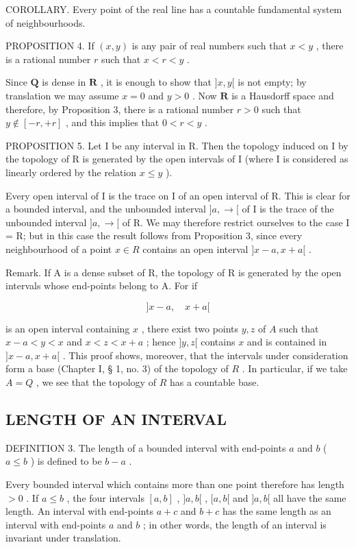 COROLLARY. Every point of the real line has a countable fundamental system of neighbourhoods.

PROPOSITION 4. If \((x, y)\) is any pair of real numbers such that \(x < y\) , there is a rational number \(r\) such that \(x < r < y\) .

Since \(\mathbf{Q}\) is dense in \(\mathbf{R}\) , it is enough to show that \(]x, y[\) is not empty; by translation we may assume \(x = 0\) and \(y > 0\) . Now \(\mathbf{R}\) is a Hausdorff space and therefore, by Proposition 3, there is a rational number \(r > 0\) such that \(y \notin [-r, +r]\) , and this implies that \(0 < r < y\) .

PROPOSITION 5. Let I be any interval in R. Then the topology induced on I by the topology of R is generated by the open intervals of I (where I is considered as linearly ordered by the relation \(x \leqslant y\) ).

Every open interval of I is the trace on I of an open interval of R. This is clear for a bounded interval, and the unbounded interval \(]a, \rightarrow[\) of I is the trace of the unbounded interval \(]a, \rightarrow[\) of R. We may therefore restrict ourselves to the case I = R; but in this case the result follows from Proposition 3, since every neighbourhood of a point \(x \in R\) contains an open interval \(]x - a, x + a[\) .

Remark. If A is a dense subset of R, the topology of R is generated by the open intervals whose end-points belong to A. For if

\[
] x - a, \quad x + a [
\]

is an open interval containing \(x\) , there exist two points \(y, z\) of \(A\) such that \(x - a < y < x\) and \(x < z < x + a\) ; hence \(]y, z[\) contains \(x\) and is contained in \(]x - a, x + a[\) . This proof shows, moreover, that the intervals under consideration form a base (Chapter I, § 1, no. 3) of the topology of \(R\) . In particular, if we take \(A = Q\) , we see that the topology of \(R\) has a countable base.

\subsection{LENGTH OF AN INTERVAL}

DEFINITION 3. The length of a bounded interval with end-points \(a\) and \(b\) ( \(a \leqslant b\) ) is defined to be \(b - a\) .

Every bounded interval which contains more than one point therefore has length \(> 0\) . If \(a \leqslant b\) , the four intervals \([a, b]\) , \(]a, b[\) , \([a, b[\) and \(]a, b[\) all have the same length. An interval with end-points \(a + c\) and \(b + c\) has the same length as an interval with end-points \(a\) and \(b\) ; in other words, the length of an interval is invariant under translation.

